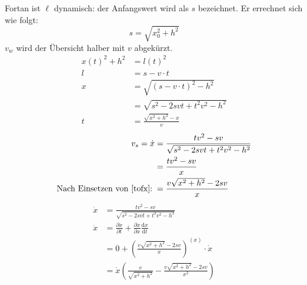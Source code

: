 \documentclass[12pt,a4paper,notitlepage]{article}
\title{}
\newcommand{\diff}{\mathrm{d}}
\begin{document}
Fortan ist $\ell$ dynamisch: der Anfangswert wird als $s$ bezeichnet. Er errechnet sich wie folgt:
\begin{equation}
s=\sqrt{x_0^2+h^2}
\end{equation}
$v_w$ wird der Übersicht halber mit $v$ abgekürzt.
\begin{align}
x(t)^2+h^2&=l(t)^2\\
l&=s-v\cdot t\\
x&=\sqrt{\left(s-v\cdot t\right)^2-h^2}\\
&=\sqrt{s^2-2svt+t^2v^2-h^2}\\
t&=\frac{\sqrt{x^2+h^2}-x}{v}\label{tofx}
\end{align}
\begin{align}
v_s=\dot x&=\frac{tv^2-sv}{\sqrt{s^2-2svt+t^2v^2-h^2}}\\
&=\frac{tv^2-sv}{x}\\
\text{Nach Einsetzen von \ref{tofx}:}\;&=\frac{v\sqrt{x^2+h^2}-2sv}{x}
\end{align}
\begin{align}
\dot x&=\frac{tv^2-sv}{\sqrt{s^2-2svt+t^2v^2-h^2}}\\
\ddot x&=\frac{\partial\dot x}{\partial t}+\frac{\partial\dot x}{\partial x}\frac{\diff x}{\diff t}\\
&=0+\left(\frac{v\sqrt{x^2+h^2}-2sv}{x}\right)^{(x)}\cdot\dot x\\
&=\dot x\left(\frac{v}{\sqrt{x^2+h^2}}-\frac{v\sqrt{x^2+h^2}-2sv}{x^2}\right)
\end{align}
\end{document}
